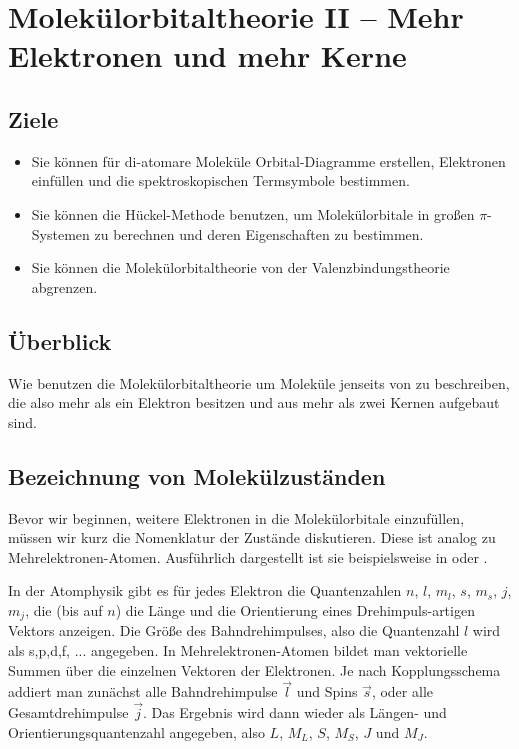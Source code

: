 

\chapter{Molekülorbitaltheorie II -- Mehr Elektronen und mehr Kerne}

\label{chap:MO-teil2}


\section{Ziele}

\begin{itemize}
\item Sie können für di-atomare Moleküle Orbital-Diagramme erstellen, Elektronen einfüllen und die spektroskopischen Termsymbole bestimmen.

\item Sie können die Hückel-Methode benutzen, um Molekülorbitale in großen $\pi$-Systemen zu berechnen und deren Eigenschaften zu bestimmen.

\item Sie können die Molekülorbitaltheorie von der Valenzbindungstheorie abgrenzen.

\end{itemize}

\section{Überblick}

Wie benutzen die Molekülorbitaltheorie um Moleküle jenseits von  zu beschreiben, die also mehr als ein Elektron besitzen und aus mehr als zwei Kernen aufgebaut sind.



\section{Bezeichnung von Molekülzuständen}



Bevor wir beginnen, weitere Elektronen in die Molekülorbitale einzufüllen, müssen wir kurz die Nomenklatur der Zustände diskutieren. Diese ist analog zu Mehrelektronen-Atomen. Ausführlich dargestellt ist sie beispielsweise in \cite{Demtröder_molekuelphysik} oder \cite{Demtröder_AMP}.



In der Atomphysik gibt es für jedes Elektron die Quantenzahlen $n$, $l$, $m_l$, $s$, $m_s$, $j$, $m_j$, die (bis auf $n$) die Länge und die Orientierung eines Drehimpuls-artigen Vektors anzeigen. Die Größe des Bahndrehimpulses, also die 
Quantenzahl $l$ wird als s,p,d,f, ... angegeben. In Mehrelektronen-Atomen bildet man vektorielle Summen über die einzelnen Vektoren der Elektronen. Je nach Kopplungsschema addiert man zunächst alle Bahndrehimpulse $\vec{l}$ und Spins $\vec{s}$, oder alle Gesamtdrehimpulse $\vec{j}$. Das Ergebnis wird dann wieder als Längen- und Orientierungsquantenzahl angegeben, also $L$, $M_L$, $S$, $M_S$, $J$ und $M_J$.


